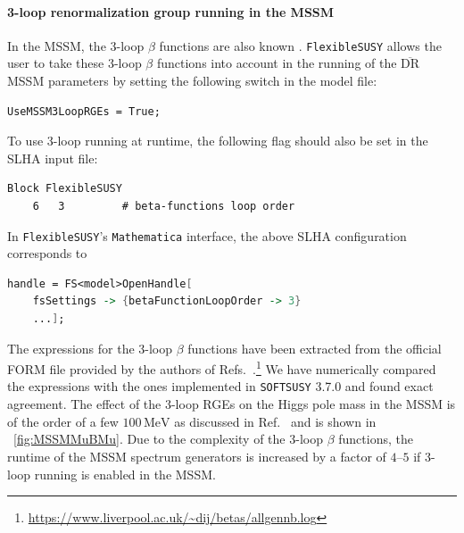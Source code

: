 \documentclass[final,3p,11pt,pdflatex]{elsarticle}
\makeatletter
\newcommand{\fs}{\texttt{FlexibleSUSY}\@\xspace}
\newcommand{\softsusy}{\texttt{SOFTSUSY}\@\xspace}
\newcommand{\mathematica}{\texttt{Ma\-the\-ma\-ti\-ca}\xspace}
\newcommand{\ol}[1]{\overline{#1}}
\newcommand{\DRbar}{\ensuremath{\ol{\text{DR}}}\xspace}
\newcommand{\unit}[1]{\,\text{#1}}      %
\newcommand{\figref}[1]{\figurename~\ref{#1}}
\makeatother
\begin{document}
\paragraph{3-loop renormalization group running in the MSSM}

In the MSSM, the 3-loop $\beta$ functions are also known
\cite{Jack:2003sx,Jack:2004ch}.  \fs allows the user to take these 3-loop
$\beta$ functions into account in the running of the \DRbar MSSM parameters by
setting the following switch in the model file:
%
\begin{lstlisting}
UseMSSM3LoopRGEs = True;
\end{lstlisting}
%
To use 3-loop running at runtime, the following flag should also be set in
the SLHA input file:
%
\\\begin{minipage}{\linewidth}
\begin{lstlisting}
Block FlexibleSUSY
    6   3         # beta-functions loop order
\end{lstlisting}
\end{minipage}
%
In \fs's \mathematica interface, the above SLHA configuration
corresponds to
%
\begin{lstlisting}[language=Mathematica]
handle = FS<model>OpenHandle[
    fsSettings -> {betaFunctionLoopOrder -> 3}
    ...];
\end{lstlisting}
%
The expressions for the 3-loop $\beta$ functions have been extracted
from the official FORM file provided by the authors of
Refs.~\cite{Jack:2003sx,Jack:2004ch}.\footnote{\url{https://www.liverpool.ac.uk/~dij/betas/allgennb.log}}
We have numerically compared the expressions with the ones implemented
in \softsusy 3.7.0 \cite{Allanach:2014nba} and found exact agreement.
%
The effect of the 3-loop RGEs on the Higgs pole mass in the MSSM is of
the order of a few $100\unit{MeV}$ as discussed in
Ref.~\cite{Allanach:2014nba} and is shown in \figref{fig:MSSMMuBMu}.
%
Due to the complexity of the 3-loop $\beta$ functions, the runtime of
the MSSM spectrum generators is increased by a factor of $4$--$5$ if
3-loop running is enabled in the MSSM\@.
\end{document}

